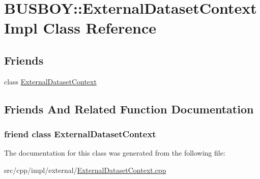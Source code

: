 \hypertarget{classBUSBOY_1_1ExternalDatasetContextImpl}{
\section{BUSBOY::ExternalDatasetContextImpl Class Reference}
\label{classBUSBOY_1_1ExternalDatasetContextImpl}
}
\subsection*{Friends}
\begin{DoxyCompactItemize}
\item 
class \hyperlink{classBUSBOY_1_1ExternalDatasetContextImpl_a901e2c563081727d642b9a20e5c2ccb2}{ExternalDatasetContext}
\end{DoxyCompactItemize}


\subsection{Friends And Related Function Documentation}
\hypertarget{classBUSBOY_1_1ExternalDatasetContextImpl_a901e2c563081727d642b9a20e5c2ccb2}{
\subsubsection[{ExternalDatasetContext}]{\setlength{\rightskip}{0pt plus 5cm}friend class {\bf ExternalDatasetContext}}}
\label{classBUSBOY_1_1ExternalDatasetContextImpl_a901e2c563081727d642b9a20e5c2ccb2}


The documentation for this class was generated from the following file:\begin{DoxyCompactItemize}
\item 
src/cpp/impl/external/\hyperlink{ExternalDatasetContext_8cpp}{ExternalDatasetContext.cpp}\end{DoxyCompactItemize}
